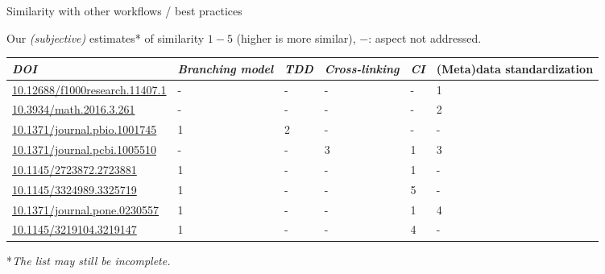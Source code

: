 \documentclass[
	aspectratio=169,%
	color={accentcolor=2d},
	logo=true,%
	colorframetitle=true,%
	]{tudabeamer}
\begin{document}

\begin{frame}{Similarity with other workflows / best practices}

	\vfill
	Our \emph{(subjective)} estimates* of similarity $1-5$ (higher is more similar), $-$: aspect not addressed.
	\begin{center}
		\scriptsize
		\begin{tabular}{@{} *6l @{}}    \toprule
				\emph{DOI} & \emph{Branching model} & \emph{TDD} & \emph{Cross-linking} & \emph{CI}  & (Meta)data standardization \\\midrule
				 \href{https://doi.org/10.12688/f1000research.11407.1}{10.12688/f1000research.11407.1} 
					 & -  & -  & -  & - & 1  \\ 
				 \href{https://doi.org/10.3934/math.2016.3.261}{10.3934/math.2016.3.261} 
					 & -  & -  & -  & - & 2  \\ 
				 \href{https://doi.org/10.1371/journal.pbio.1001745}{10.1371/journal.pbio.1001745} 
					 & 1  & 2  & -  & - & -  \\ 
				 \href{https://doi.org/10.1371/journal.pcbi.1005510}{10.1371/journal.pcbi.1005510}
					 & -  & -  & 3 & 1 & 3  \\ 
				 \href{https://doi.org/10.1145/2723872.2723881}{10.1145/2723872.2723881}
					 & 1  & -  & - & 1 & -  \\ 
				 \href{https://dl.acm.org/doi/10.1145/3324989.3325719}{10.1145/3324989.3325719}
					 & 1  & -  & - & 5 & -  \\ 
				 \href{https://doi.org/10.1371/journal.pone.0230557}{10.1371/journal.pone.0230557}
					 & 1  & -  & - & 1 & 4  \\ 
				 \href{https://doi.org/10.1145/3219104.3219147}{10.1145/3219104.3219147} 
					 & 1  & -  & -  & 4 & - \\\bottomrule
				 \hline
		\end{tabular}
	\end{center}
	
	*\emph{The list may still be incomplete.}
	
\end{frame}
\end{document}
